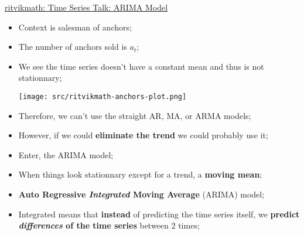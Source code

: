 \documentclass[12pt, titlepage, french]{report}
\begin{document}
\begin{YTB_SUMM}{\href{https://www.youtube.com/watch?v=3UmyHed0iYE&list=PLvcbYUQ5t0UHOLnBzl46_Q6QKtFgfMGc3&index=9}{ritvikmath: Time Series Talk: ARIMA Model}}
\begin{itemize}
	\item	Context is salesman of anchors;
	\item[]	The number of anchors sold is $a_{t}$;
	\item[]	We see the time series doesn't have a constant mean and thus is not stationnary;
	
	\texttt{[image: src/ritvikmath-anchors-plot.png]}
	\item[]	Therefore, we can't use the straight AR, MA, or ARMA models;
	\item	However, if we could \textbf{eliminate the trend} we could probably use it;
	\item[]	Enter, the ARIMA model;
	\item[]	When things look stationnary except for a trend, a \textbf{moving mean};
	\item	\textbf{Auto Regressive \textit{Integrated} Moving Average} (ARIMA) model;
	\item[]	Integrated means that \textbf{instead} of predicting the time series itself, we \textbf{predict \textit{differences} of the time series} between 2 times;
	

\end{itemize}
\end{YTB_SUMM}
\end{document}
